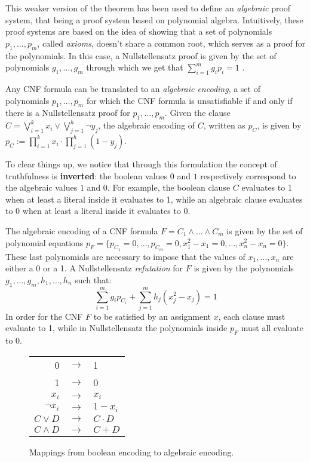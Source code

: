This weaker version of the theorem has been used to define an \textit{algebraic} proof system, that being a proof system based on polynomial algebra. Intuitively, these proof systems are based on the idea of showing that a set of polynomials $p_1, \ldots, p_m$, called \textit{axioms}, doesn't share a common root, which serves as a proof for the polynomials. In this case, a Nullstellensatz proof is given by the set of polynomials $g_1, \ldots, g_m$ through which we get that $\sum_{i=1}^m g_ip_i = 1$  \cite{ns_definitions}. 

Any CNF formula can be translated to an \textit{algebraic encoding}, a set of polynomials $p_1, \ldots, p_m$ for which the CNF formula is unsatisfiable if and only if there is a Nullstellensatz proof for $p_1, \ldots, p_m$. Given the clause $C = \bigvee_{i = 1}^k x_i \lor \bigvee_{j = 1}^h \lnot y_j$, the algebraic encoding of $C$, written as $p_C$, is given by $p_C := \prod_{i = 1}^{k} x_i \cdot \prod_{j = 1}^h (1- y_j)$. 

To clear things up, we notice that through this formulation the concept of truthfulness is \textbf{inverted}: the boolean values $0$ and $1$ respectively correspond to the algebraic values $1$ and $0$. For example, the boolean clause $C$ evaluates to 1 when at least a literal inside it evaluates to 1, while an algebraic clause evaluates to 0 when at least a literal inside it evaluates to 0.

The algebraic encoding of a CNF formula $F = C_1 \land \ldots \land C_m$ is given by the set of polynomial equations $p_F = \{p_{C_1} = 0, \ldots, p_{C_m} = 0, x_1^2-x_1 = 0, \ldots, x_n^2-x_n = 0\}$. These last polynomials are necessary to impose that the values of $x_1, \ldots, x_n$ are either a 0 or a 1. A Nullstellensatz \textit{refutation} for $F$ is given by the polynomials $g_1, \ldots, g_m, h_1, \ldots, h_n$ such that:
\[\sum_{i = 1}^m g_ip_{C_i} + \sum_{j = 1}^m h_j(x_j^2-x_j) = 1\]
In order for the CNF $F$ to be satisfied by an assignment $x$, each clause must evaluate to 1, while in Nullstellensatz the polynomials inside $p_F$ must all evaluate to 0. 

\begin{figure}[H]
    \centering
    \begin{tabular}{r c l}
 0 & $\longrightarrow$ & 1 \\
 1 & $\longrightarrow$ & 0 \\
        $x_i$ & $\longrightarrow$ & $x_i$ \\
        $\lnot x_i$ & $\longrightarrow$ & $1-x_i$ \\
        $C \lor D$ & $\longrightarrow$ & $C \cdot D$ \\
        $C \land D$ & $\longrightarrow$ & $C + D$ \\
    \end{tabular}

    \caption{Mappings from boolean encoding to algebraic encoding.}
\end{figure}

